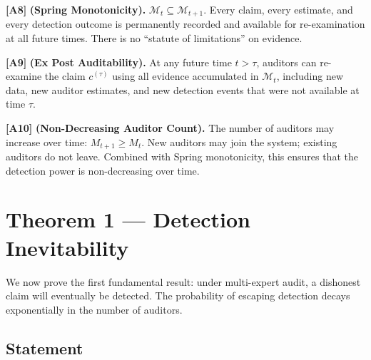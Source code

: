 \documentclass[11pt,a4paper]{article}
\theoremstyle{definition}
\theoremstyle{remark}
\newcommand{\assumptionTag}[1]{\textsf{\textbf{[A#1]}}}
\newcommand{\cM}{\mathcal{M}}
\newcommand{\claim}{c}
\begin{document}
\assumptionTag{8} \textbf{(Spring Monotonicity).} $\cM_t \subseteq \cM_{t+1}$. Every claim, every estimate, and every detection outcome is permanently recorded and available for re-examination at all future times. There is no ``statute of limitations'' on evidence.

\assumptionTag{9} \textbf{(Ex Post Auditability).} At any future time $t > \tau$, auditors can re-examine the claim $\claim^{(\tau)}$ using all evidence accumulated in $\cM_t$, including new data, new auditor estimates, and new detection events that were not available at time $\tau$.

\assumptionTag{10} \textbf{(Non-Decreasing Auditor Count).} The number of auditors may increase over time: $M_{t+1} \geq M_t$. New auditors may join the system; existing auditors do not leave. Combined with Spring monotonicity, this ensures that the detection power is non-decreasing over time.

\section{Theorem 1 --- Detection Inevitability }
\label{sec:thm1}

We now prove the first fundamental result: under multi-expert audit, a dishonest claim will eventually be detected. The probability of escaping detection decays exponentially in the number of auditors.

\subsection{Statement}
\end{document}
